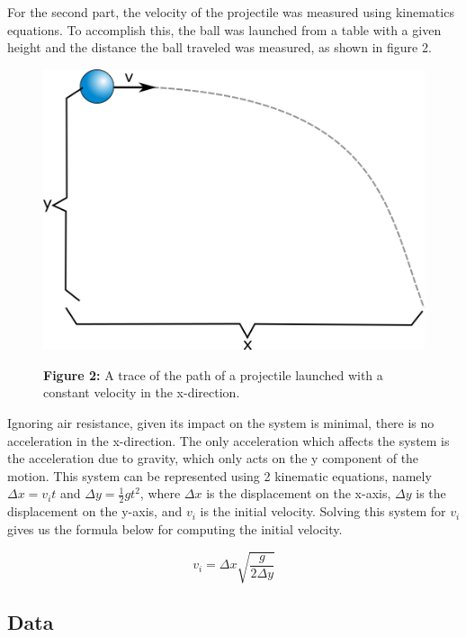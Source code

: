\documentclass[11pt]{article}
\begin{document}
For the second part, the velocity of the projectile was measured using
kinematics equations. To accomplish this, the ball was launched from a
table with a given height and the distance the ball traveled was
measured, as shown in figure 2. 
\begin{figure}
\begin{center}
\includegraphics[scale=0.4]{Part2Diagram.png}

\textbf{Figure 2:} A trace of the path of a projectile launched with a constant velocity in the x-direction.
\end{center}
\end{figure}
Ignoring air resistance, given its impact on the system is minimal,
there is no acceleration in the x-direction. The only acceleration which
affects the system is the acceleration due to gravity, which only acts
on the y component of the motion. This system can be represented using 2
kinematic equations, namely \(\Delta x = v_i t\) and
\(\Delta y = \frac{1}{2}gt^2\), where \(\Delta x\) is the displacement
on the x-axis, \(\Delta y\) is the displacement on the y-axis, and
\(v_i\) is the initial velocity. Solving this system for \(v_i\) gives
us the formula below for computing the initial velocity.

\begin{equation}
v_i = \Delta x \sqrt{\frac {g}{2\Delta y}}
\end{equation}

\hypertarget{data}{%
\subsection*{\centering Data}\label{data}}
\end{document}
